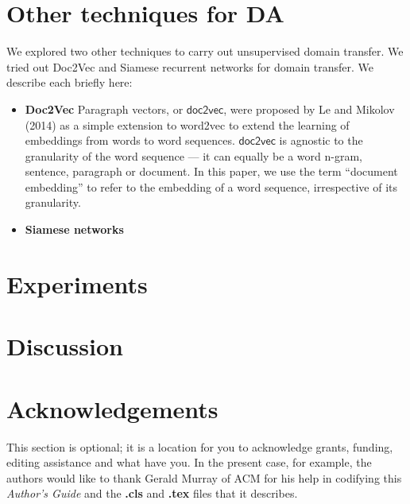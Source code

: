\documentclass{sigkddExp}
\begin{document}
\section{Other techniques for DA}
\label{other_techniques}
We explored two other techniques to carry out unsupervised domain transfer. We tried out Doc2Vec \cite{doc2vec1} and Siamese recurrent networks \cite{siamese} for domain transfer. We describe each briefly here:
\begin{itemize}[topsep=0pt,itemsep=-1ex,partopsep=1ex,parsep=1ex]
\item \textbf{Doc2Vec} Paragraph vectors, or $\mathsf{doc2vec}$, were proposed by Le and Mikolov (2014) as a simple extension to word2vec to extend the learning of embeddings from words to word sequences. $\mathsf{doc2vec}$ is agnostic to the  granularity of the word sequence — it can equally be a word n-gram, sentence, paragraph or document. In this paper, we use the term ``document embedding'' to refer to the embedding of a word sequence, irrespective of its granularity.

\item \textbf{Siamese networks} 

\end{itemize}

\section{Experiments}
\label{experiments}

\section{Discussion}
\label{discussion}

\section{Acknowledgements}
\label{ack}
This section is optional; it is a location for you
to acknowledge grants, funding, editing assistance and
what have you.  In the present case, for example, the
authors would like to thank Gerald Murray of ACM for
his help in codifying this \textit{Author's Guide}
and the \textbf{.cls} and \textbf{.tex} files that it describes.

%

%
%

\end{document}
